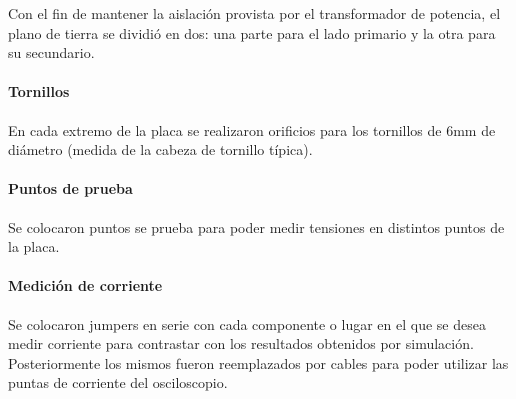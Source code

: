 Con el fin de mantener la aislación provista por el transformador de potencia, 
el plano de tierra se dividió en dos: una parte para el lado primario y la otra para su secundario.

\paragraph{Tornillos}

En cada extremo de la placa se realizaron orificios para los tornillos de 6mm de diámetro (medida de la cabeza de tornillo típica). 

\paragraph{Puntos de prueba}

Se colocaron puntos se prueba para poder medir tensiones en distintos puntos de la placa.

\paragraph{Medición de corriente} 

Se colocaron jumpers en serie con cada componente o lugar
en el que se desea medir corriente para contrastar con los resultados obtenidos por simulación.
Posteriormente los mismos fueron reemplazados por cables
para poder utilizar las puntas de corriente del osciloscopio.